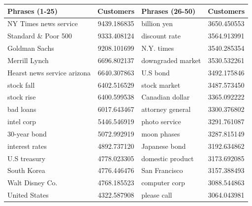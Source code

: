 \begin{table}[h]
  \centering
  \begin{tabular}{lc|lc}
    Phrases (1-25) & Customers & Phrases (26-50) & Customers \\ \hline \hline
    NY Times news service                   & 9439.186835 &    billion yen                             & 3650.450553  \\
    Standard \& Poor 500                    & 9333.408124 &    discount rate                           & 3564.913991  \\
    Goldman Sachs                           & 9208.101699 &    N.Y. times                              & 3540.285354  \\
    Merrill Lynch                           & 6696.802137 &    downgraded market                       & 3530.532261  \\
    Hearst news service arizona             & 6640.307863 &    U.S bond                                & 3492.175846  \\
    stock fall                              & 6402.516529 &    stock market                            & 3487.573450  \\
    stock rise                              & 6400.599538 &    Canadian dollar                         & 3365.092222  \\
    bad loans                               & 6017.643467 &    attorney general                        & 3300.376802  \\
    intel corp                              & 5446.546919 &    photo service                           & 3291.761087  \\
    30-year bond                            & 5072.992919 &    moon phases                             & 3287.815149  \\
    interest rates                          & 4892.737120 &    Japanese bond                           & 3192.634862  \\
    U.S treasury                            & 4778.023305 &    domestic product                        & 3173.692085  \\
    South Korea                             & 4776.446476 &    San Francisco                           & 3157.388493  \\
    Walt Disney Co.                         & 4768.185523 &    computer corp                           & 3088.544863  \\
    United States                           & 4322.587908 &    please call                             & 3064.043981  \\

\end{tabular}
\end{table}
